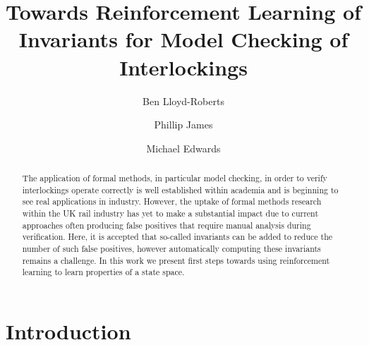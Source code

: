 \documentclass[runningheads]{llncs}
\begin{document}
%
\title{Towards Reinforcement Learning of Invariants for Model Checking of Interlockings}
%
%
\author{Ben Lloyd-Roberts \and
Phillip James \and
Michael Edwards}
%
%


%
\maketitle              %
%
\begin{abstract}
The application of formal methods, in particular model checking, in order to verify interlockings operate correctly is well established within academia and is beginning to see real applications in industry. However, the uptake of formal methods research within the UK rail industry has yet to make a substantial impact due to current approaches often producing false positives that require manual analysis during verification. Here, it is accepted that so-called invariants can be added to reduce the number of such false positives, however automatically computing these invariants remains a challenge. In this work we present first steps towards using reinforcement learning to learn properties of a state space.

\end{abstract}


\section{Introduction}
\end{document}
